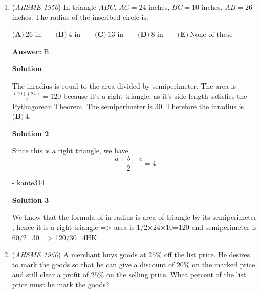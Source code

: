 \begin{enumerate}
 Radius of second circle
 \[2 \pi r = 25\]
 \[r = \frac{25}{2 \pi}\]

 The difference of these radii is 

 
 \[\frac{25}{2 \pi} - \frac{10}{\pi} = \frac{5}{2 \pi}\]

 So the answer is $\boxed{\textbf{(D)}\ \dfrac{5}{2\pi}\text{ in}}$.

 



\textbf{Solution 3}

Let the radius of the circle with the larger circumference be $r_2$ and the circle with the smaller circumference be $r_1$. Calculating the ratio of the two
 \[\frac{r_2}{r_1}=\frac{25}{20}=\frac{5}{4}\]
 \[4r_2=5r_1\]
 \[4(r_2-r_1)=r_1\]
 \[r_2-r_1=\frac{r_1}{4}=\frac{\frac{20}{2\pi}}{4}=\frac{10}{4\pi}=\boxed{\textbf{(D)}\ \dfrac{5}{2\pi}\text{ in}}\]



	\item (\textit{AHSME 1950}) In triangle $ABC$, $AC=24$ inches, $BC=10$ inches, $AB=26$ inches. The radius of the inscribed circle is:


 $\textbf{(A)}\ 26\text{ in}\qquad\textbf{(B)}\ 4\text{ in}\qquad\textbf{(C)}\ 13\text{ in}\qquad\textbf{(D)}\ 8\text{ in}\qquad\textbf{(E)}\ \text{None of these}$

 \textbf{Answer: }B



\textbf{Solution}

The inradius is equal to the area divided by semiperimeter. The area is $\frac{(10)(24)}{2} = 120$ because it's a right triangle, as it's side length satisfies the Pythagorean Theorem. The semiperimeter is $30$. Therefore the inradius is $\boxed{\textbf{(B)}\ 4}$.

 



\textbf{Solution 2}

Since this is a right triangle, we have
 \[\frac{a+b-c}{2}=\boxed{4}\]

 - kante314

 



\textbf{Solution 3}

We know that the formula of in radius is area of triangle by its semiperimeter , hence it is a right triangle => area is 1/2×24×10=120 and semiperimeter is 60/2=30 => 120/30=4HK🗿

 


	\item (\textit{AHSME 1950}) A merchant buys goods at $25\%$ off the list price. He desires to mark the goods so that he can give a discount of $20\%$ on the marked price and still clear a profit of $25\%$ on the selling price. What percent of the list price must he mark the goods?



\end{enumerate}
